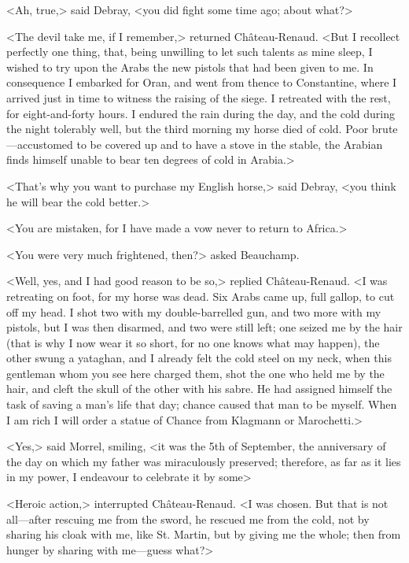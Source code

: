  <Ah, true,> said Debray, <you did fight some time ago; about what?>

<The devil take me, if I remember,> returned Château-Renaud. <But I recollect perfectly one thing, that, being unwilling to let such talents as mine sleep, I wished to try upon the Arabs the new pistols that had been given to me. In consequence I embarked for Oran, and went from thence to Constantine, where I arrived just in time to witness the raising of the siege. I retreated with the rest, for eight-and-forty hours. I endured the rain during the day, and the cold during the night tolerably well, but the third morning my horse died of cold. Poor brute—accustomed to be covered up and to have a stove in the stable, the Arabian finds himself unable to bear ten degrees of cold in Arabia.> 

 <That's why you want to purchase my English horse,> said Debray, <you think he will bear the cold better.> 

 <You are mistaken, for I have made a vow never to return to Africa.> 

 <You were very much frightened, then?> asked Beauchamp. 

 <Well, yes, and I had good reason to be so,> replied Château-Renaud. <I was retreating on foot, for my horse was dead. Six Arabs came up, full gallop, to cut off my head. I shot two with my double-barrelled gun, and two more with my pistols, but I was then disarmed, and two were still left; one seized me by the hair (that is why I now wear it so short, for no one knows what may happen), the other swung a yataghan, and I already felt the cold steel on my neck, when this gentleman whom you see here charged them, shot the one who held me by the hair, and cleft the skull of the other with his sabre. He had assigned himself the task of saving a man's life that day; chance caused that man to be myself. When I am rich I will order a statue of Chance from Klagmann or Marochetti.> 

 <Yes,> said Morrel, smiling, <it was the 5th of September, the anniversary of the day on which my father was miraculously preserved; therefore, as far as it lies in my power, I endeavour to celebrate it by some\longdash>

<Heroic action,> interrupted Château-Renaud. <I was chosen. But that is not all—after rescuing me from the sword, he rescued me from the cold, not by sharing his cloak with me, like St. Martin, but by giving me the whole; then from hunger by sharing with me—guess what?> 


